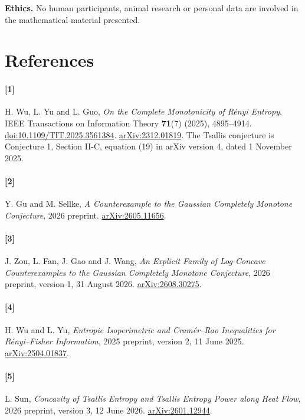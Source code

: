 \documentclass[
  11pt,
]{article}
\begin{document}
\textbf{Ethics.} No human participants, animal research or personal data
are involved in the mathematical material presented.

\section*{References}\label{references}

\paragraph{{[}1{]}}\label{section}

H. Wu, L. Yu and L. Guo, \emph{On the Complete Monotonicity of Rényi
Entropy}, IEEE Transactions on Information Theory \textbf{71}(7) (2025),
4895--4914.
\href{https://doi.org/10.1109/TIT.2025.3561384}{doi:10.1109/TIT.2025.3561384}.
\href{https://arxiv.org/abs/2312.01819v4}{arXiv:2312.01819}. The Tsallis
conjecture is Conjecture 1, Section II-C, equation (19) in arXiv version
4, dated 1 November 2025.

\paragraph{{[}2{]}}\label{section-1}

Y. Gu and M. Sellke, \emph{A Counterexample to the Gaussian Completely
Monotone Conjecture}, 2026 preprint.
\href{https://arxiv.org/abs/2605.11656v1}{arXiv:2605.11656}.

\paragraph{{[}3{]}}\label{section-2}

J. Zou, L. Fan, J. Gao and J. Wang, \emph{An Explicit Family of
Log-Concave Counterexamples to the Gaussian Completely Monotone
Conjecture}, 2026 preprint, version 1, 31 August 2026.
\href{https://arxiv.org/abs/2608.30275v1}{arXiv:2608.30275}.

\paragraph{{[}4{]}}\label{section-3}

H. Wu and L. Yu, \emph{Entropic Isoperimetric and Cramér--Rao
Inequalities for Rényi--Fisher Information}, 2025 preprint, version 2,
11 June 2025.
\href{https://arxiv.org/abs/2504.01837v2}{arXiv:2504.01837}.

\paragraph{{[}5{]}}\label{section-4}

L. Sun, \emph{Concavity of Tsallis Entropy and Tsallis Entropy Power
along Heat Flow}, 2026 preprint, version 3, 12 June 2026.
\href{https://arxiv.org/abs/2601.12944v3}{arXiv:2601.12944}.
\end{document}
